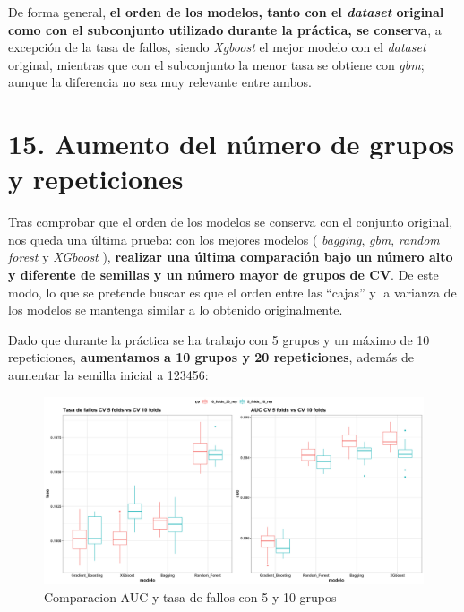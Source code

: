 \documentclass[
]{article}
\begin{document}
De forma general, \textbf{el orden de los modelos, tanto con el
\emph{dataset} original como con el subconjunto utilizado durante la
práctica, se conserva}, a excepción de la tasa de fallos, siendo
\emph{Xgboost} el mejor modelo con el \emph{dataset} original, mientras
que con el subconjunto la menor tasa se obtiene con \emph{gbm}; aunque
la diferencia no sea muy relevante entre ambos.

\hypertarget{aumento-del-nuxfamero-de-grupos-y-repeticiones}{%
\section{15. Aumento del número de grupos y
repeticiones}\label{aumento-del-nuxfamero-de-grupos-y-repeticiones}}

Tras comprobar que el orden de los modelos se conserva con el conjunto
original, nos queda una última prueba: con los mejores modelos (
\emph{bagging}, \emph{gbm}, \emph{random forest} y \emph{XGboost} ),
\textbf{realizar una última comparación bajo un número alto y diferente
de semillas y un número mayor de grupos de CV}. De este modo, lo que se
pretende buscar es que el orden entre las ``cajas'' y la varianza de los
modelos se mantenga similar a lo obtenido originalmente.

Dado que durante la práctica se ha trabajo con 5 grupos y un máximo de
10 repeticiones, \textbf{aumentamos a 10 grupos y 20 repeticiones},
además de aumentar la semilla inicial a 123456:

\begin{figure}[h!]

{\centering \includegraphics[width=0.99\linewidth,height=0.99\textheight,]{./charts/comparacion_5_10_folds} 

}

\caption{Comparacion AUC y tasa de fallos con 5 y 10 grupos}\label{fig:unnamed-chunk-153}
\end{figure}
\end{document}
